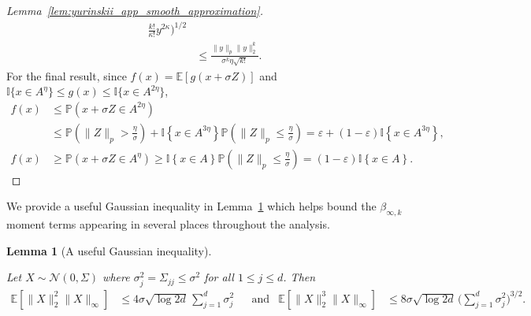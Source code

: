 \documentclass[11pt,lof]{puthesis}
\renewcommand{\P}{\ensuremath{\mathbb{P}}}
\newcommand{\E}{\ensuremath{\mathbb{E}}}
\newcommand{\I}{\ensuremath{\mathbb{I}}}
\newcommand{\cN}{\ensuremath{\mathcal{N}}}
\theoremstyle{break}
\newtheorem{lemma}{Lemma}[section]
\theoremstyle{proof}
\newtheorem{proof}{Proof}
\begin{document}
\begin{proof}[Lemma~\ref{lem:yurinskii_app_smooth_approximation}]
\begin{align*}
      \frac{k!}{\kappa!}
      y^{2 \kappa}
    \Bigg)^{1/2} \\
    &\leq
    \frac{\|y\|_p \|y\|_2^k}{\sigma^k \eta \sqrt{k!}}.
  \end{align*}
  For the final result, since
  $f(x) = \E \left[ g(x + \sigma Z) \right]$ and
  $\I\big\{x \in A^\eta\big\}\leq g(x)\leq \I\big\{x \in A^{2\eta}\big\}$,
  \begin{align*}
    f(x)
    &\leq
    \P \left( x + \sigma Z \in A^{2 \eta} \right) \\
    &\leq
    \P \left( \|Z\|_p > \frac{\eta}{\sigma} \right)
    + \I \left\{ x \in A^{3 \eta} \right\}
    \P \left( \|Z\|_p \leq \frac{\eta}{\sigma} \right)
    = \varepsilon
    + (1 - \varepsilon) \I \left\{ x \in A^{3 \eta} \right\}, \\
    f(x)
    &\geq
    \P \left( x + \sigma Z \in A^{\eta} \right)
    \geq
    \I \left\{ x \in A \right\}
    \P \left( \|Z\|_p \leq \frac{\eta}{\sigma} \right)
    = (1 - \varepsilon) \I \left\{ x \in A \right\}.
  \end{align*}
\end{proof}

We provide a useful Gaussian inequality in
Lemma~\ref{lem:yurinskii_app_gaussian_useful}
which helps bound the $\beta_{\infty,k}$ moment terms appearing in several
places throughout the analysis.

\begin{lemma}[A useful Gaussian inequality]%
  \label{lem:yurinskii_app_gaussian_useful}

  Let $X \sim \cN(0, \Sigma)$
  where $\sigma_j^2 = \Sigma_{j j} \leq \sigma^2$ for all $1 \leq j \leq d$.
  Then
  \begin{align*}
    \E\left[
      \|X\|_2^2
      \|X\|_\infty
    \right]
    &\leq
    4 \sigma \sqrt{\log 2d}
    \,\sum_{j=1}^d \sigma_j^2
    &&\text{and}
    &\E\left[
      \|X\|_2^3
      \|X\|_\infty
    \right]
    &\leq
    8 \sigma \sqrt{\log 2d}
    \,\bigg( \sum_{j=1}^d \sigma_j^2 \bigg)^{3/2}.
  \end{align*}
\end{lemma}
\end{document}
